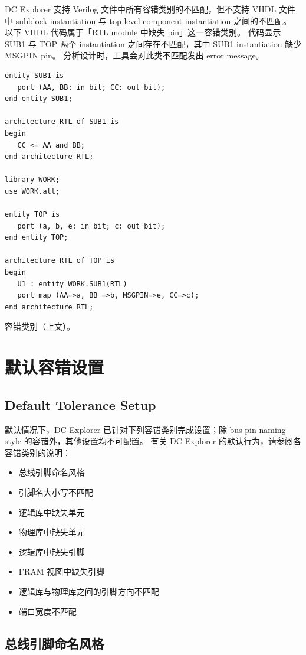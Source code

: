 DC Explorer 支持 Verilog 文件中所有容错类别的不匹配，但不支持 VHDL 文件中 subblock instantiation 与 top-level component instantiation 之间的不匹配。
以下 VHDL 代码属于「RTL module 中缺失 pin」这一容错类别。
代码显示 SUB1 与 TOP 两个 instantiation 之间存在不匹配，其中 SUB1 instantiation 缺少 MSGPIN pin。
分析设计时，工具会对此类不匹配发出 error message。
\begin{lstlisting}
entity SUB1 is
   port (AA, BB: in bit; CC: out bit);
end entity SUB1;

architecture RTL of SUB1 is
begin
   CC <= AA and BB;
end architecture RTL;

library WORK;
use WORK.all;

entity TOP is
   port (a, b, e: in bit; c: out bit);
end entity TOP;

architecture RTL of TOP is
begin
   U1 : entity WORK.SUB1(RTL)
   port map (AA=>a, BB =>b, MSGPIN=>e, CC=>c);
end architecture RTL;
\end{lstlisting}

\begin{seeAlsoBox}
容错类别（上文）。
\end{seeAlsoBox}

\section{默认容错设置}
\subsection*{Default Tolerance Setup}

默认情况下，DC Explorer 已针对下列容错类别完成设置；除 bus pin naming style 的容错外，其他设置均不可配置。
有关 DC Explorer 的默认行为，请参阅各容错类别的说明：
\begin{itemize}
  \item 总线引脚命名风格
  \item 引脚名大小写不匹配
  \item 逻辑库中缺失单元
  \item 物理库中缺失单元
  \item 逻辑库中缺失引脚
  \item FRAM 视图中缺失引脚
  \item 逻辑库与物理库之间的引脚方向不匹配
  \item 端口宽度不匹配
\end{itemize}

\subsection{总线引脚命名风格}
